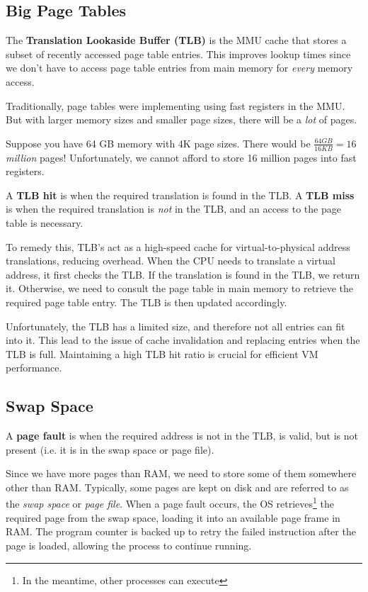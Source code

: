 \documentclass{report}
\newcommand{\definitionBegin}[1]{\begin{tcolorbox}[title={Definition: #1}]}
\newcommand{\definitionEnd}{\end{tcolorbox}}
\newcommand{\exampleBegin}[1]{\begin{tcolorbox}[colback=blue!5!white,colframe=black!75!blue,title={Example:
      #1}]}
\newcommand{\exampleEnd}{\end{tcolorbox}}
\begin{document}
\subsection{Big Page Tables}
\label{subsec:TLB}
\definitionBegin{Translation Lookaside Buffer}
The \textbf{Translation Lookaside Buffer (TLB)} is the MMU cache that stores a subset of recently
accessed page table entries. This improves lookup times since we don't have to access page table
entries from main memory for \textit{every} memory access.
\definitionEnd

Traditionally, page tables were implementing using fast registers in the MMU. But with larger memory
sizes and smaller page sizes, there will be a \textit{lot} of pages.

\exampleBegin{How Many Pages?}
Suppose you have 64 GB memory with 4K page sizes. There would be $\frac{64 \textit{GB}}{16
  \textit{KB}} = 16$ \textit{million} pages! Unfortunately, we cannot afford to store 16 million
pages into fast registers. 
\exampleEnd

\definitionBegin{TLB Hit and Miss}
A \textbf{TLB hit} is when the required translation is found in the TLB.
\tcblower
A \textbf{TLB miss} is when the required translation is \textit{not} in the TLB, and an access to
the page table is necessary.
\definitionEnd
To remedy this, TLB's act as a high-speed cache for virtual-to-physical address translations,
reducing overhead. When the CPU needs to translate a virtual address, it first checks the TLB. If
the translation is found in the TLB, we return it. Otherwise, we need to consult the page table in
main memory to retrieve the required page table entry. The TLB is then updated accordingly.

Unfortunately, the TLB has a limited size, and therefore not all entries can fit into it. This lead
to the issue of cache invalidation and replacing entries when the TLB is full. Maintaining a high
TLB hit ratio is crucial for efficient VM performance.


\subsection{Swap Space}
\definitionBegin{Page Fault}
A \textbf{page fault} is when the required address is not in the TLB, is valid, but is not present
(i.e. it is in the swap space or page file). 
\definitionEnd

Since we have more pages than RAM, we need to store some of them somewhere other than
RAM. Typically, some pages are kept on disk and are referred to as the \textit{swap space} or
\textit{page file}. When a page fault occurs, the OS retrieves\footnote{In the meantime, other
  processes can execute} the required page from the swap space, loading it into an available page
frame in RAM. The program counter is backed up to retry the failed instruction after the page is
loaded, allowing the process to continue running.  
\end{document}

